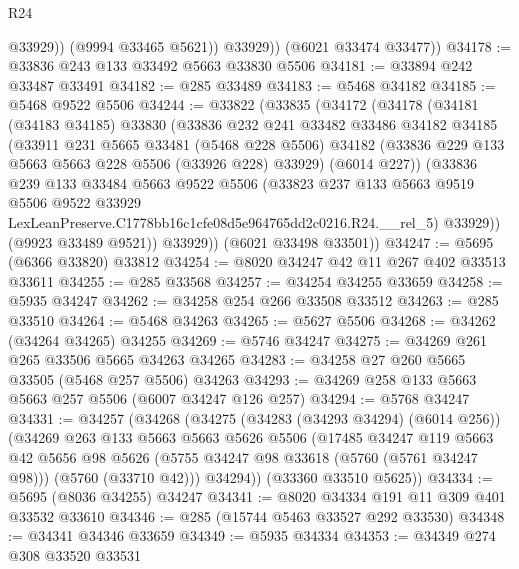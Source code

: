 \begin{lexlean}{R24}
\begin{coremodule}
                @33929))
            (@9994 @33465 @5621))
          @33929))
      (@6021 @33474 @33477))
@34178 := @33836 @243 @133 @33492 @5663 @33830 @5506
@34181 := @33894 @242 @33487 @33491
@34182 := @285 @33489
@34183 := @5468 @34182
@34185 := @5468 @9522 @5506
@34244 := @33822
    (@33835
      (@34172
        (@34178
          (@34181
            (@34183 @34185)
            @33830
            (@33836
              @232
              @241
              @33482
              @33486
              @34182
              @34185
              (@33911
                @231
                @5665
                @33481
                (@5468 @228 @5506)
                @34182
                (@33836 @229 @133 @5663 @5663 @228 @5506 (@33926 @228) @33929)
                (@6014 @227))
              (@33836
                @239
                @133
                @33484
                @5663
                @9522
                @5506
                (@33823
                  @237
                  @133
                  @5663
                  @9519
                  @5506
                  @9522
                  @33929
                  LexLeanPreserve.C1778bb16c1cfe08d5e964765dd2c0216.R24.__rel_5)
                @33929))
            (@9923 @33489 @9521))
          @33929))
      (@6021 @33498 @33501))
@34247 := @5695 (@6366 @33820) @33812
@34254 := @8020 @34247 @42 @11 @267 @402 @33513 @33611
@34255 := @285 @33568
@34257 := @34254 @34255 @33659
@34258 := @5935 @34247
@34262 := @34258 @254 @266 @33508 @33512
@34263 := @285 @33510
@34264 := @5468 @34263
@34265 := @5627 @5506
@34268 := @34262 (@34264 @34265) @34255
@34269 := @5746 @34247
@34275 := @34269 @261 @265 @33506 @5665 @34263 @34265
@34283 := @34258 @27 @260 @5665 @33505 (@5468 @257 @5506) @34263
@34293 := @34269 @258 @133 @5663 @5663 @257 @5506 (@6007 @34247 @126 @257)
@34294 := @5768 @34247
@34331 := @34257
    (@34268
      (@34275
        (@34283 (@34293 @34294) (@6014 @256))
        (@34269
          @263
          @133
          @5663
          @5663
          @5626
          @5506
          (@17485
            @34247
            @119
            @5663
            @42
            @5656
            @98
            @5626
            (@5755 @34247 @98 @33618 (@5760 (@5761 @34247 @98)))
            (@5760 (@33710 @42)))
          @34294))
      (@33360 @33510 @5625))
@34334 := @5695 (@8036 @34255) @34247
@34341 := @8020 @34334 @191 @11 @309 @401 @33532 @33610
@34346 := @285 (@15744 @5463 @33527 @292 @33530)
@34348 := @34341 @34346 @33659
@34349 := @5935 @34334
@34353 := @34349 @274 @308 @33520 @33531

\end{coremodule}
\end{lexlean}
